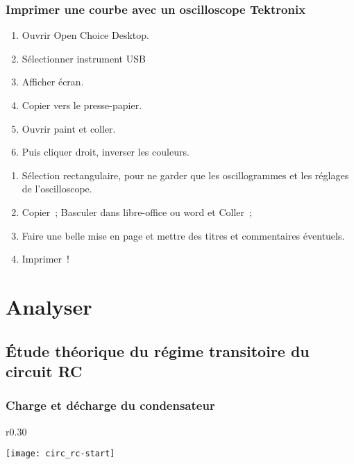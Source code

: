\documentclass[../main/main.tex]{subfiles}
\begin{document}
\subsubsection{Imprimer une courbe avec un oscilloscope Tektronix}

\begin{minipage}{0.49\linewidth}
	\begin{enumerate}
		\item Ouvrir Open Choice Desktop.
		\item Sélectionner instrument USB
		\item Afficher écran.
		\item Copier vers le presse-papier.
		\item Ouvrir paint et coller.
		\item Puis cliquer droit, inverser les couleurs.
	\end{enumerate}
\end{minipage}
\begin{minipage}{0.49\linewidth}
	\begin{enumerate}[start=6]
		\item Sélection rectangulaire, pour ne garder que les oscillogrammes et les
		      réglages de l'oscilloscope.
		\item Copier~; Basculer dans libre-office ou word et Coller~;
		\item Faire une belle mise en page et mettre des titres et commentaires
		      éventuels.
		\item Imprimer~!
	\end{enumerate}
\end{minipage}


\section{Analyser}
\subsection{Étude théorique du régime transitoire du circuit RC}

\subsubsection{Charge et décharge du condensateur}

\begin{wrapfigure}[5]{r}{0.30\linewidth}
	\begin{center}
		\texttt{[image: circ\_rc-start]}
	\end{center}
\end{wrapfigure}
\end{document}
